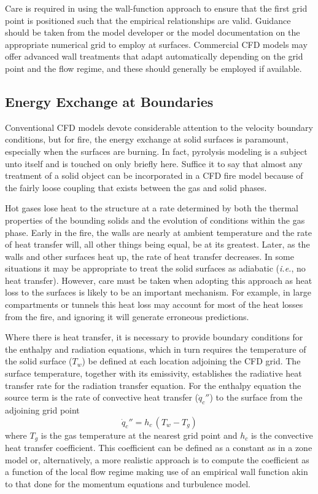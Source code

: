 \documentclass[graybox]{svmult}
\begin{document}
Care is required in using the wall-function approach to ensure that the first grid point is positioned such that the empirical relationships are valid. Guidance should be taken from the model developer or the model documentation on the appropriate numerical grid to employ at surfaces. Commercial CFD models may offer advanced wall treatments that adapt automatically depending on the grid point and the flow regime, and these should generally be employed if available.

\subsection{Energy Exchange at Boundaries}

Conventional CFD models devote considerable attention to the velocity boundary conditions, but for fire, the energy exchange at solid surfaces is paramount, especially when the surfaces are burning. In fact, pyrolysis modeling is a subject unto itself and is touched on only briefly here. Suffice it to say that almost any treatment of a solid object can be incorporated in a CFD fire model because of the fairly loose coupling that exists between the gas and solid phases.

Hot gases lose heat to the structure at a rate determined by both the thermal properties of the bounding solids and the evolution of conditions within the gas phase. Early in the fire, the walls are nearly at ambient temperature and the rate of heat transfer will, all other things being equal, be at its greatest. Later, as the walls and other surfaces heat up, the rate of heat transfer decreases. In some situations it may be appropriate to treat the solid surfaces as adiabatic ({\em i.e.}, no heat transfer). However, care must be taken when adopting this approach as heat loss to the surfaces is likely to be an important mechanism. For example, in large compartments or tunnels this heat loss may account for most of the heat losses from the fire, and ignoring it will generate erroneous predictions.

Where there is heat transfer, it is necessary to provide boundary conditions for the enthalpy and radiation equations, which in turn requires the temperature of the solid surface ($T_w$) be defined at each location adjoining the CFD grid. The surface temperature, together with its emissivity, establishes the radiative heat transfer rate for the radiation transfer equation. For the enthalpy equation the source term is the rate of convective heat transfer ($\dot{q}_c''$) to the surface from the adjoining grid point
\begin{equation}
\dot{q}_c'' = h_c \, (T_w-T_g)
\label{eq:convection}
\end{equation}
where $T_g$ is the gas temperature at the nearest grid point and $h_c$ is the convective heat transfer coefficient. This coefficient can be defined as a constant as in a zone model or, alternatively, a more realistic approach is to compute the coefficient as a function of the local flow regime making use of an empirical wall function akin to that done for the momentum equations and turbulence model.
\end{document}
